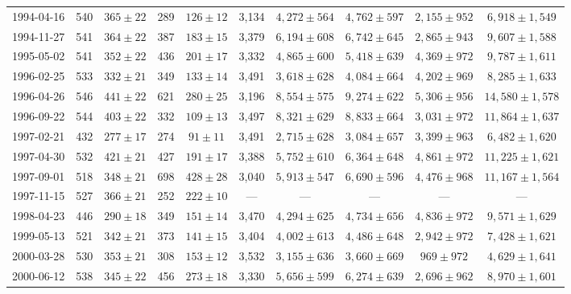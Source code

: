 \begin{landscape}
\begin{longtable}{cccccccccc}
{1994-04-16} & 540 & {$365  \pm  22$} & 289 & {$126 \pm 12$} & 3,134 & {$4,272 \pm 564$} & {$4,762 \pm 597$} & {$2,155 \pm 952$} & {$6,918 \pm 1,549$} \\
{1994-11-27} & 541 & {$364  \pm  22$} & 387 & {$183 \pm 15$} & 3,379 & {$6,194 \pm 608$} & {$6,742 \pm 645$} & {$2,865 \pm 943$} & {$9,607 \pm 1,588$} \\
{1995-05-02} & 541 & {$352  \pm  22$} & 436 & {$201 \pm 17$} & 3,332 & {$4,865 \pm 600$} & {$5,418 \pm 639$} & {$4,369 \pm 972$} & {$9,787 \pm 1,611$} \\
{1996-02-25} & 533 & {$332  \pm  21$} & 349 & {$133 \pm 14$} & 3,491 & {$3,618 \pm 628$} & {$4,084 \pm 664$} & {$4,202 \pm 969$} & {$8,285 \pm 1,633$} \\
{1996-04-26} & 546 & {$441  \pm  22$} & 621 & {$280 \pm 25$} & 3,196 & {$8,554 \pm 575$} & {$9,274 \pm 622$} & {$5,306 \pm 956$} & {$14,580 \pm 1,578$} \\
{1996-09-22} & 544 & {$403  \pm  22$} & 332 & {$109 \pm 13$} & 3,497 & {$8,321 \pm 629$} & {$8,833 \pm 664$} & {$3,031 \pm 972$} & {$11,864 \pm 1,637$} \\
{1997-02-21} & 432 & {$277  \pm  17$} & 274 & {$91 \pm 11$} & 3,491 & {$2,715 \pm 628$} & {$3,084 \pm 657$} & {$3,399 \pm 963$} & {$6,482 \pm 1,620$} \\
{1997-04-30} & 532 & {$421  \pm  21$} & 427 & {$191 \pm 17$} & 3,388 & {$5,752 \pm 610$} & {$6,364 \pm 648$} & {$4,861 \pm 972$} & {$11,225 \pm 1,621$} \\
{1997-09-01} & 518 & {$348  \pm  21$} & 698 & {$428 \pm 28$} & 3,040 & {$5,913 \pm 547$} & {$6,690 \pm 596$} & {$4,476 \pm 968$} & {$11,167 \pm 1,564$} \\
{1997-11-15} & 527 & {$366  \pm  21$} & 252 & {$222 \pm 10$} & --- & --- & --- & --- & --- \\
{1998-04-23} & 446 & {$290  \pm  18$} & 349 & {$151 \pm 14$} & 3,470 & {$4,294 \pm 625$} & {$4,734 \pm 656$} & {$4,836 \pm 972$} & {$9,571 \pm 1,629$} \\
{1999-05-13} & 521 & {$342  \pm  21$} & 373 & {$141 \pm 15$} & 3,404 & {$4,002 \pm 613$} & {$4,486 \pm 648$} & {$2,942 \pm 972$} & {$7,428 \pm 1,621$} \\
{2000-03-28} & 530 & {$353  \pm  21$} & 308 & {$153 \pm 12$} & 3,532 & {$3,155 \pm 636$} & {$3,660 \pm 669$} & {$969 \pm 972$} & {$4,629 \pm 1,641$} \\
{2000-06-12} & 538 & {$345  \pm  22$} & 456 & {$273 \pm 18$} & 3,330 & {$5,656 \pm 599$} & {$6,274 \pm 639$} & {$2,696 \pm 962$} & {$8,970 \pm 1,601$} \\

\end{longtable}
\end{landscape}
